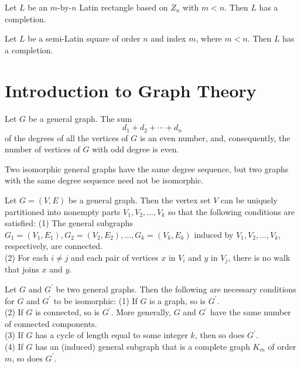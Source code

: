 \begin{theorem}
  \label{thm:10.4.11}
  Let $L$ be an $m$-by-$n$ Latin rectangle based on $Z_n$ with $m < n$. Then $L$ has a completion.
\end{theorem}

\begin{theorem}
  \label{thm:10.4.12}
  Let $L$ be a semi-Latin square of order $n$ and index $m$, where $m < n$. Then $L$ has a completion.
\end{theorem}

\chapter{Introduction to Graph Theory}

\begin{theorem}
  \label{thm:11.1.1}
  Let $G$ be a general graph. The sum
  \[ d_1 + d_2 + \cdots + d_n\]
  of the degrees of all the vertices of $G$ is an even number, and, consequently, the number of 
  vertices of $G$ with odd degree is even.
\end{theorem}

\begin{theorem}
  \label{thm:11.1.2}
  Two isomorphic general graphs have the same degree sequence, but two graphs with the same degree 
  sequence need not be isomorphic.
\end{theorem}

\begin{theorem}
  \label{thm:11.1.3}
  Let $G=(V, E)$ be a general graph. Then the vertex set $V$ can be uniquely partitioned into 
  nonempty parts $V_1, V_2, \ldots, V_k$ so that the following conditions are satisfied:
  (1) The general subgraphs $G_1=\left(V_1, E_1\right), G_2=\left(V_2, E_2\right), \ldots, G_k=
  \left(V_k, E_k\right)$ induced by $V_1, V_2, \ldots, V_k$, respectively, are connected.\\
  (2) For each $i \neq j$ and each pair of vertices $x$ in $V_i$ and $y$ in $V_j$, there is no walk 
  that joins $x$ and $y$.
\end{theorem}

\begin{theorem}
  \label{thm:11.1.4}
  Let $G$ and $G^{\prime}$ be two general graphs. Then the following are necessary conditions for 
  $G$ and $G^{\prime}$ to be isomorphic:
  (1) If $G$ is a graph, so is $G^{\prime}$.\\
  (2) If $G$ is connected, so is $G^{\prime}$. More generally, $G$ and $G^{\prime}$ have the same 
  number of connected components.\\
  (3) If $G$ has a cycle of length equal to some integer $k$, then so does $G^{\prime}$.\\
  (4) If $G$ has an (induced) general subgraph that is a complete graph $K_m$ of order $m$, so does
  $G^{\prime}$.
\end{theorem}

